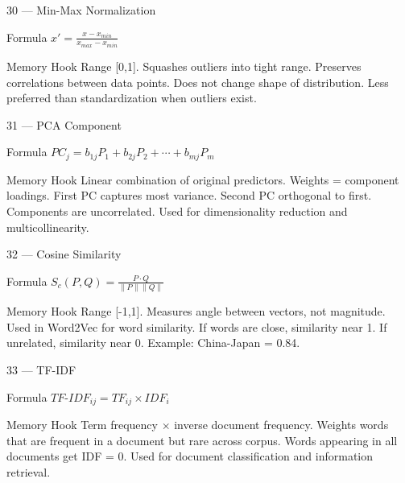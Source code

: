 \documentclass[aspectratio=169,8pt]{beamer}
\begin{document}
	\begin{frame}{30 --- Min-Max Normalization}
		\begin{block}{Formula}
			$x' = \frac{x - x_{min}}{x_{max} - x_{min}}$
		\end{block}
		\begin{block}{Memory Hook}
			Range [0,1]. Squashes outliers into tight range. Preserves correlations between data points. Does not change shape of distribution. Less preferred than standardization when outliers exist.
		\end{block}
	\end{frame}
	
	\begin{frame}{31 --- PCA Component}
		\begin{block}{Formula}
			$PC_j = b_{1j}P_1 + b_{2j}P_2 + \cdots + b_{mj}P_m$
		\end{block}
		\begin{block}{Memory Hook}
			Linear combination of original predictors. Weights = component loadings. First PC captures most variance. Second PC orthogonal to first. Components are uncorrelated. Used for dimensionality reduction and multicollinearity.
		\end{block}
	\end{frame}
	
	\begin{frame}{32 --- Cosine Similarity}
		\begin{block}{Formula}
			$S_c(P,Q) = \frac{P \cdot Q}{\|P\| \|Q\|}$
		\end{block}
		\begin{block}{Memory Hook}
			Range [-1,1]. Measures angle between vectors, not magnitude. Used in Word2Vec for word similarity. If words are close, similarity near 1. If unrelated, similarity near 0. Example: China-Japan = 0.84.
		\end{block}
	\end{frame}
	
	\begin{frame}{33 --- TF-IDF}
		\begin{block}{Formula}
			$TF\text{-}IDF_{ij} = TF_{ij} \times IDF_i$
		\end{block}
		\begin{block}{Memory Hook}
			Term frequency $\times$ inverse document frequency. Weights words that are frequent in a document but rare across corpus. Words appearing in all documents get IDF = 0. Used for document classification and information retrieval.
		\end{block}
	\end{frame}
	
\end{document}
